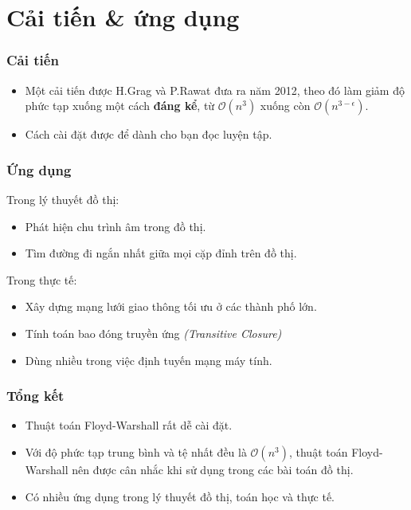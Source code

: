 \documentclass[12pt]{beamer}
\begin{document}
    \section{Cải tiến \& ứng dụng}
    \begin{frame}
        \frametitle{Cải tiến}
        \begin{itemize}
        \item Một cải tiến được H.Grag và P.Rawat đưa ra năm 2012\cite{improve:article}, theo đó làm giảm độ phức tạp xuống một cách \textbf{đáng kể}, từ $\mathcal{O}(n^3)$ xuống còn $\mathcal{O}(n^{3 - \epsilon})$.
        \item Cách cài đặt được để dành cho bạn đọc luyện tập.
        \end{itemize}
    \end{frame}

    \begin{frame}
        \frametitle{Ứng dụng}
        Trong lý thuyết đồ thị:
        \begin{itemize}
            \item Phát hiện chu trình âm trong đồ thị.
            \item Tìm đường đi ngắn nhất giữa mọi cặp đỉnh trên đồ thị.
        \end{itemize}\pause
        Trong thực tế:
        \begin{itemize}
            \item Xây dựng mạng lưới giao thông tối ưu ở các thành phố lớn.
            \item Tính toán bao đóng truyền ứng \textit{(Transitive Closure)}
            \item Dùng nhiều trong việc định tuyến mạng máy tính.
        \end{itemize}
    \end{frame}

    \begin{frame}
        \frametitle{Tổng kết}
        \begin{itemize}
            \item Thuật toán Floyd-Warshall rất dễ cài đặt.\pause
            \item Với độ phức tạp trung bình và tệ nhất đều là $\mathcal{O}(n^3)$, thuật toán Floyd-Warshall nên được cân nhắc khi sử dụng trong các bài toán đồ thị.\pause
            \item Có nhiều ứng dụng trong lý thuyết đồ thị, toán học và thực tế.
        \end{itemize}
    \end{frame}
\end{document}
